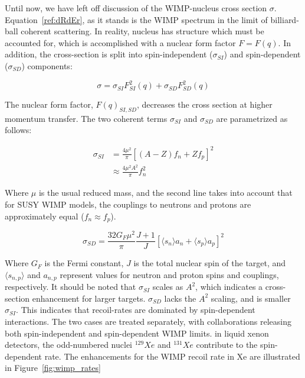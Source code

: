 Until now, we have left off discussion of the \ac{WIMP}-nucleus cross section $\sigma$. Equation~\ref{ref:dRdEr}, as it stands is the \ac{WIMP} spectrum in the limit of billiard-ball coherent scattering. In reality, nucleus has structure which must be accounted for, which is accomplished with a nuclear form factor $F = F(q)$. In addition, the cross-section is split into spin-independent ($\sigma_{SI}$) and spin-dependent ($\sigma_{SD}$) components:

\begin{equation}
\sigma = \sigma_{SI}F^{2}_{SI}(q) + \sigma_{SD}F^{2}_{SD}(q)
\end{equation}

The nuclear form factor, $F(q)_{SI, SD}$, decreases the cross section at higher momentum transfer. The two coherent terms $\sigma_{SI}$ and  $\sigma_{SD}$ are parametrized as follows:

\begin{equation}
\begin{split}
\sigma_{SI} &= \frac{4 \mu^{2} }{\pi} [ (A-Z) f_{n} + Zf_{p}]^{2} \\
 & \approx \frac{4 \mu^{2} A^{2}}{\pi} f_{n}^{2}
\end{split}
\end{equation}

Where $\mu$ is the usual reduced mass, and the second line takes into account that for \ac{SUSY} \ac{WIMP} models, the couplings to neutrons and protons are approximately equal ($f_{n} \approx f_{p}$).

\begin{equation}
\sigma_{SD} = \frac{32 G_{F} \mu^{2}}{\pi} \frac{J+1}{J} [\langle s_{n} \rangle a_{n} + \langle s_{p} \rangle a_{p}] ^{2}
\end{equation}

Where $G_{F}$ is the Fermi constant, $J$ is the total nuclear spin of the target, and $\langle s_{n,p} \rangle$ and $a_{n,p}$ represent values for neutron and proton spins and couplings, respectively. It should be noted that $\sigma_{SI}$ scales as $A^{2}$, which indicates a cross-section enhancement for larger targets. $\sigma_{SD}$ lacks the $A^{2}$ scaling, and is smaller $\sigma_{SI}$. This indicates that recoil-rates are dominated by spin-dependent interactions. The two cases are treated separately, with collaborations releasing both spin-independent and spin-dependent \ac{WIMP} limits. in liquid xenon detectors, the odd-numbered nuclei $^{129}Xe$ and $^{131}Xe$ contribute to the spin-dependent rate. The enhancements for the \ac{WIMP} recoil rate in Xe are illustrated in Figure~\ref{fig:wimp_rates}


